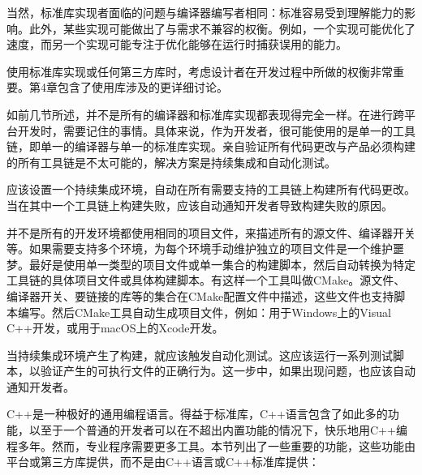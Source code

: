 当然，标准库实现者面临的问题与编译器编写者相同：标准容易受到理解能力的影响。此外，某些实现可能做出了与需求不兼容的权衡。例如，一个实现可能优化了速度，而另一个实现可能专注于优化能够在运行时捕获误用的能力。

使用标准库实现或任何第三方库时，考虑设计者在开发过程中所做的权衡非常重要。第4章包含了使用库涉及的更详细讨论。


如前几节所述，并不是所有的编译器和标准库实现都表现得完全一样。在进行跨平台开发时，需要记住的事情。具体来说，作为开发者，很可能使用的是单一的工具链，即单一的编译器与单一的标准库实现。亲自验证所有代码更改与产品必须构建的所有工具链是不太可能的，解决方案是持续集成和自动化测试。

应该设置一个持续集成环境，自动在所有需要支持的工具链上构建所有代码更改。当在其中一个工具链上构建失败，应该自动通知开发者导致构建失败的原因。

并不是所有的开发环境都使用相同的项目文件，来描述所有的源文件、编译器开关等。如果需要支持多个环境，为每个环境手动维护独立的项目文件是一个维护噩梦。最好是使用单一类型的项目文件或单一集合的构建脚本，然后自动转换为特定工具链的具体项目文件或具体构建脚本。有这样一个工具叫做CMake。源文件、编译器开关、要链接的库等的集合在CMake配置文件中描述，这些文件也支持脚本编写。然后CMake工具自动生成项目文件，例如：用于Windows上的Visual C++开发，或用于macOS上的Xcode开发。

当持续集成环境产生了构建，就应该触发自动化测试。这应该运行一系列测试脚本，以验证产生的可执行文件的正确行为。这一步中，如果出现问题，也应该自动通知开发者。


C++是一种极好的通用编程语言。得益于标准库，C++语言包含了如此多的功能，以至于一个普通的开发者可以在不超出内置功能的情况下，快乐地用C++编程多年。然而，专业程序需要更多工具。本节列出了一些重要的功能，这些功能由平台或第三方库提供，而不是由C++语言或C++标准库提供：

